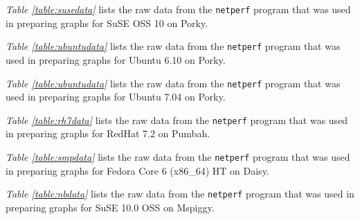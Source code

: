 \documentclass[letterpaper,final,notitlepage,twocolumn,10pt,twoside]{article}
\begin{document}
\begin{appendix}
\textit{Table \ref{table:susedata}} lists the raw data from the
\texttt{netperf} program that was used in preparing graphs for SuSE OSS 10 on
Porky.

\textit{Table \ref{table:ubuntudata}} lists the raw data from the
\texttt{netperf} program that was used in preparing graphs for Ubuntu 6.10 on
Porky.

\textit{Table \ref{table:ubuntudata}} lists the raw data from the
\texttt{netperf} program that was used in preparing graphs for Ubuntu 7.04 on
Porky.

\textit{Table \ref{table:rh7data}} lists the raw data from the
\texttt{netperf} program that was used in preparing graphs for RedHat 7.2 on
Pumbah.

\textit{Table \ref{table:smpdata}} lists the raw data from the
\texttt{netperf} program that was used in preparing graphs for Fedora Core 6
(x86\_64) HT on Daisy.

\textit{Table \ref{table:nbdata}} lists the raw data from the \texttt{netperf}
program that was used in preparing graphs for SuSE 10.0 OSS on Mspiggy.


\end{appendix}
\end{document}
